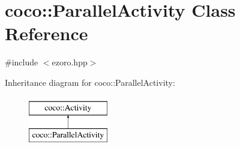 \hypertarget{classcoco_1_1_parallel_activity}{\section{coco\-:\-:Parallel\-Activity Class Reference}
\label{classcoco_1_1_parallel_activity}
}


{\ttfamily \#include $<$ezoro.\-hpp$>$}

Inheritance diagram for coco\-:\-:Parallel\-Activity\-:\begin{figure}[H]
\begin{center}
\leavevmode
\includegraphics[height=2.000000cm]{classcoco_1_1_parallel_activity}
\end{center}
\end{figure}

